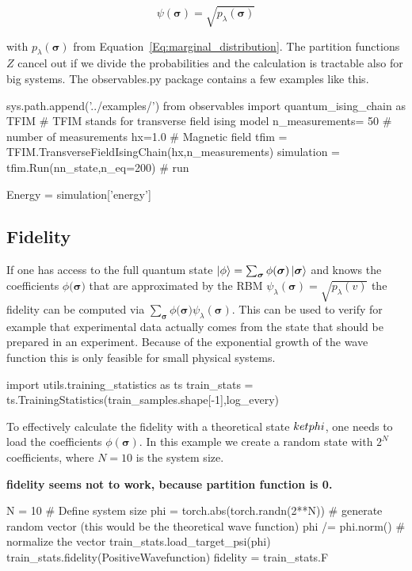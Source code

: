 \documentclass[submission, Phys]{SciPost}
\begin{document}
\begin{equation}
\psi(\bm{\sigma}) = \sqrt{p_{\lambda}(\bm{\sigma})}
\end{equation}

with $p_{\lambda}(\bm{\sigma})$ from Equation~\ref{Eq:marginal_distribution}. The partition functions $Z$ cancel out if we divide the probabilities and the calculation is tractable also for big systems.
The observables.py package contains a few examples like this.

\begin{python}
sys.path.append('../examples/')
from observables import quantum_ising_chain as TFIM
# TFIM stands for transverse field ising model
n_measurements= 50 # number of measurements
hx=1.0             # Magnetic field
tfim = TFIM.TransverseFieldIsingChain(hx,n_measurements)
simulation = tfim.Run(nn_state,n_eq=200) # run 

Energy = simulation['energy']
\end{python}

\subsection{Fidelity}

If one has access to the full quantum state $\ket{\phi} = \sum_{\bm{\sigma}} \phi(\bm{\sigma}) \ket{ \bm{\sigma}}$ and knows the coefficients $\phi(\bm{\sigma)}$ that are approximated by the RBM $\psi_{\lambda}(\bm{\sigma}) = \sqrt{p_{\lambda}(v)}$ the fidelity can be computed via $\sum_{\bm{\sigma}} \phi(\bm{\sigma)} \psi_{\lambda}(\bm{\sigma})$. This can be used to verify for example that experimental data actually comes from the state that should be prepared in an experiment. Because of the exponential growth of the wave function this is only feasible for small physical systems.

\begin{python}
import utils.training_statistics as ts
train_stats = ts.TrainingStatistics(train_samples.shape[-1],log_every)
\end{python}

To effectively calculate the fidelity with a theoretical state $\\ket{phi}$, one needs to load the coefficients $\phi(\bm{\sigma})$. In this example we create a random state with $2^N$ coefficients, where $N=10$ is the system size.

\textbf{fidelity seems not to work, because partition function is 0.}

\begin{python}
N = 10 # Define system size
phi =  torch.abs(torch.randn(2**N)) # generate random vector (this would be the theoretical wave function)
phi /= phi.norm() # normalize the vector
train_stats.load_target_psi(phi)
train_stats.fidelity(PositiveWavefunction)
fidelity = train_stats.F
\end{python}
\end{document}
